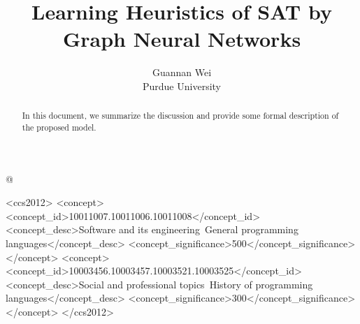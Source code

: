 \documentclass[sigplan,10pt]{acmart}\settopmatter{printfolios=true,printccs=false,printacmref=false}
\begin{document}
\title{Learning Heuristics of SAT by Graph Neural Networks}         %

\author
[Guannan Wei]
{Guannan Wei \\ Purdue University}

\lstMakeShortInline[keywordstyle=,%
              flexiblecolumns=false,%
              mathescape=false,%
              basicstyle=\tt]@

\begin{abstract}
  In this document, we summarize the discussion and provide some formal description of the proposed model.
\end{abstract}


\begin{CCSXML}
<ccs2012>
<concept>
<concept_id>10011007.10011006.10011008</concept_id>
<concept_desc>Software and its engineering~General programming languages</concept_desc>
<concept_significance>500</concept_significance>
</concept>
<concept>
<concept_id>10003456.10003457.10003521.10003525</concept_id>
<concept_desc>Social and professional topics~History of programming languages</concept_desc>
<concept_significance>300</concept_significance>
</concept>
</ccs2012>
\end{CCSXML}

\end{document}
